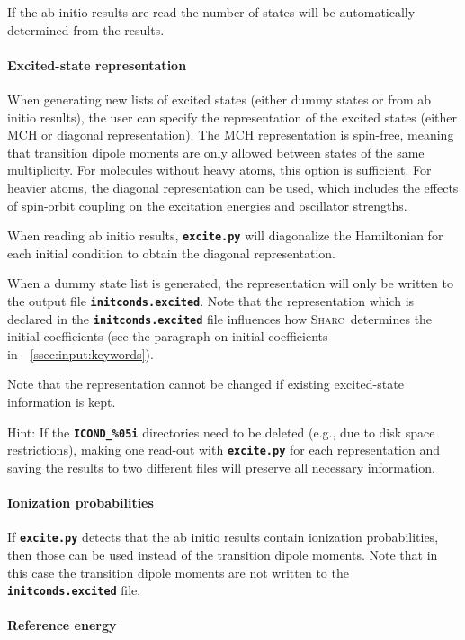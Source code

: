 \documentclass[a4paper,11pt,DIV=15,openany,twoside=false]{scrbook}
\newcommand{\sharc}{\textsc{Sharc}}
\newcommand{\ttt}[1]{\textbf{\texttt{#1}}}
\begin{document}
If the ab initio results are read the number of states will be automatically determined from the results.

\paragraph{Excited-state representation}

When generating new lists of excited states (either dummy states or from ab initio results), the user can specify the representation of the excited states (either MCH or diagonal representation). The MCH representation is spin-free, meaning that transition dipole moments are only allowed between states of the same multiplicity. For molecules without heavy atoms, this option is sufficient. For heavier atoms, the diagonal representation can be used, which includes the effects of spin-orbit coupling on the excitation energies and oscillator strengths. 

When reading ab initio results, \ttt{excite.py} will diagonalize the Hamiltonian for each initial condition to obtain the diagonal representation. 

When a dummy state list is generated, the representation will only be written to the output file \ttt{initconds.excited}. Note that the representation which is declared in the \ttt{initconds.excited} file influences how \sharc\ determines the initial coefficients (see the paragraph on initial coefficients in~~\ref{ssec:input:keywords}).

Note that the representation cannot be changed if existing excited-state information is kept. 

Hint: If the \ttt{ICOND\_\%05i} directories need to be deleted (e.g., due to disk space restrictions), making one read-out with \ttt{excite.py} for each representation and saving the results to two different files will preserve all necessary information.

\paragraph{Ionization probabilities}

If \ttt{excite.py} detects that the ab initio results contain ionization probabilities, then those can be used instead of the transition dipole moments. Note that in this case the transition dipole moments are not written to the \ttt{initconds.excited} file. 

\paragraph{Reference energy}
\end{document}
